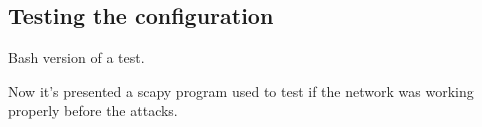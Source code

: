 
\subsection{Testing the configuration}
Bash version of a test.\par

Now it's presented a scapy program used to test if the network was working properly before the attacks.\par

